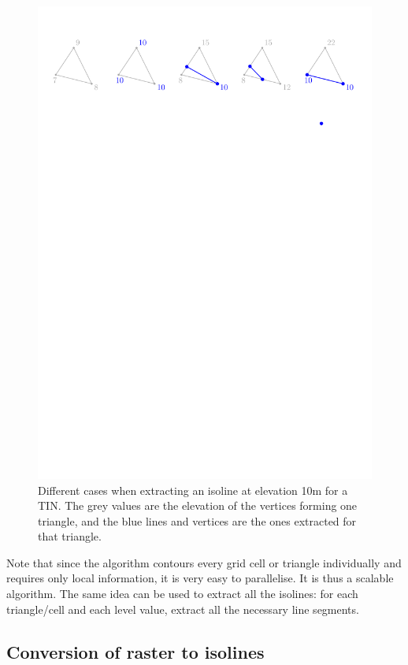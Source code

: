 \begin{figure}
  \centering
  \includegraphics[width=0.95\linewidth]{figs/isoline-tr}
\caption{Different cases when extracting an isoline at elevation 10m for a TIN. The grey values are the elevation of the vertices forming one triangle, and the blue lines and vertices are the ones extracted for that triangle.}
\label{fig:isoline-tr}
\end{figure}
Note that since the algorithm contours every grid cell or triangle individually and requires only local information, it is very easy to parallelise. 
It is thus a scalable algorithm.
The same idea can be used to extract all the isolines: for each triangle/cell and each level value, extract all the necessary line segments.


\subsection{Conversion of raster to isolines}%
\label{sec:r-iso}

